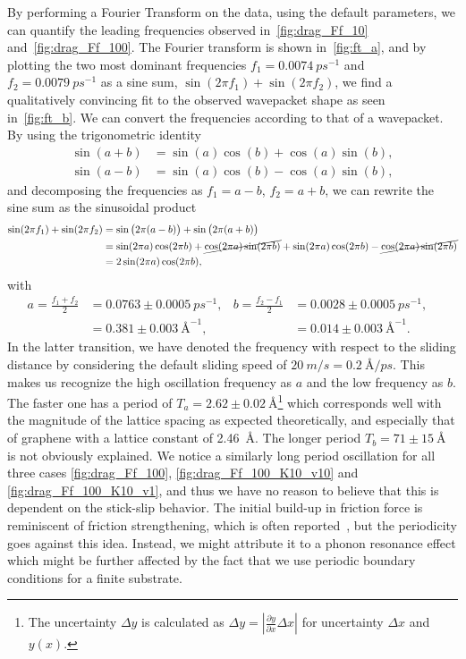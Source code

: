 By performing a Fourier Transform on the data, using the default parameters, we can quantify the leading frequencies observed in~\cref{fig:drag_Ff_10} and~\cref{fig:drag_Ff_100}. The Fourier transform is shown in~\cref{fig:ft_a}, and by plotting the two most dominant frequencies $f_1 = \SI{0.0074}{ps^{-1}}$ and $f_2 = \SI{0.0079}{ps^{-1}}$ as a sine sum, $\sin{(2\pi f_1)} + \sin{(2\pi f_2)}$, we find a qualitatively convincing fit to the observed wavepacket shape as seen in~\cref{fig:ft_b}. We can convert the frequencies according to that of a wavepacket. By using the trigonometric identity
\begin{align*}
\sin (a+b) &= \sin (a) \cos (b) + \cos (a) \sin (b), \\
\sin (a-b) &= \sin (a) \cos (b) - \cos (a) \sin (b),
\end{align*}
and decomposing the frequencies as $f_1 = a - b$, $f_2 = a + b$, we can rewrite the sine sum as the sinusoidal product
\begin{align*}
  \sin(2\pi f_1) + \sin(2\pi f_2) &= \sin\big(2\pi (a - b)\big) + \sin\big(2\pi (a + b)\big) \\
  &= \sin(2\pi a)\cos(2\pi b) + \cancel{\cos(2\pi a)\sin(2\pi b)} + \sin(2\pi a)\cos(2\pi b) - \cancel{\cos(2\pi a)\sin(2\pi b)} \\
  &= 2 \sin(2\pi a) \cos(2\pi b),
\end{align*} 
with 
\begin{align*}
  a = \frac{f_1 + f_2}{2} &= 0.0763 \pm \SI{0.0005}{ps^{-1}},& 
  b = \frac{f_2 - f_1}{2} &= 0.0028 \pm \SI{0.0005}{ps^{-1}},& \\
  &= 0.381 \pm \SI{0.003}{{\text{Å}}^{-1}},& 
  &= 0.014 \pm \SI{0.003}{{\text{Å}}^{-1}}.& 
\end{align*}
In the latter transition, we have denoted the frequency with respect to the sliding distance by considering the default sliding speed of $\SI{20}{m/s} = \SI{0.2}{\text{Å}/ps}$. This makes us recognize the high oscillation frequency as $a$ and the low frequency
as $b$. The faster one has a period of $T_a = 2.62 \pm \SI{0.02}{\text{Å}}$\footnote{The
uncertainty $\Delta y$ is calculated as $\Delta y = \left|\frac{\partial
y}{\partial x} \Delta x \right|$ for uncertainty $\Delta x$ and $y(x)$.} which
corresponds well with the magnitude of the lattice spacing as expected theoretically, and especially that of
graphene with a lattice constant of \SI{2.46}{Å}. The longer period $T_b = 71 \pm
\SI{15}{\text{Å}}$ is not obviously explained. We notice a similarly long period oscillation for all three cases \cref{fig:drag_Ff_100}, \cref{fig:drag_Ff_100_K10_v10} and \cref{fig:drag_Ff_100_K10_v1}, and thus we have no reason to believe that this is dependent on the stick-slip behavior. The initial build-up in friction force is reminiscent of friction strengthening, which is often reported~\cite{zhang_tuning_2019, li_evolving_2016}, but the periodicity goes against this idea. Instead, we might attribute it to a phonon
resonance effect which might be further affected by the fact that we use periodic boundary conditions for a finite substrate.

